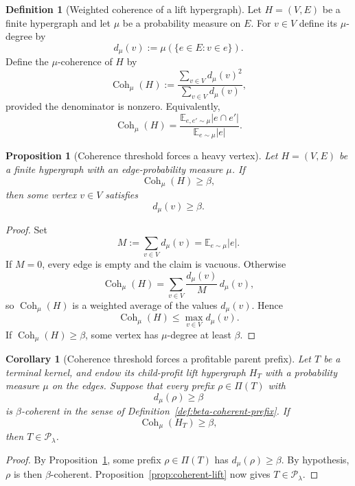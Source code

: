 \documentclass[11pt]{article}
\newtheorem{proposition}[theorem]{Proposition}
\newtheorem{corollary}[theorem]{Corollary}
\theoremstyle{definition}
\newtheorem{definition}[theorem]{Definition}
\newcommand{\1}{\mathbf{1}}
\begin{document}
\begin{definition}[Weighted coherence of a lift hypergraph]\label{def:lift-hypergraph-coherence}
Let $H=(V,E)$ be a finite hypergraph and let $\mu$ be a probability measure on $E$. For $v\in V$ define its $\mu$-degree by
\[
d_\mu(v):=\mu(\{e\in E:v\in e\}).
\]
Define the $\mu$-coherence of $H$ by
\[
\operatorname{Coh}_\mu(H):=
\frac{\sum_{v\in V} d_\mu(v)^2}{\sum_{v\in V} d_\mu(v)},
\]
provided the denominator is nonzero. Equivalently,
\[
\operatorname{Coh}_\mu(H)=
\frac{\mathbb E_{e,e'\sim \mu}|e\cap e'|}{\mathbb E_{e\sim \mu}|e|}.
\]
\end{definition}

\begin{proposition}[Coherence threshold forces a heavy vertex]\label{prop:coherence-heavy-vertex}
Let $H=(V,E)$ be a finite hypergraph with an edge-probability measure $\mu$. If
\[
\operatorname{Coh}_\mu(H)\ge \beta,
\]
then some vertex $v\in V$ satisfies
\[
d_\mu(v)\ge \beta.
\]
\end{proposition}

\begin{proof}
Set
\[
M:=\sum_{v\in V} d_\mu(v)=\mathbb E_{e\sim \mu}|e|.
\]
If $M=0$, every edge is empty and the claim is vacuous. Otherwise
\[
\operatorname{Coh}_\mu(H)
=
\sum_{v\in V}\frac{d_\mu(v)}{M}\,d_\mu(v),
\]
so $\operatorname{Coh}_\mu(H)$ is a weighted average of the values $d_\mu(v)$. Hence
\[
\operatorname{Coh}_\mu(H)\le \max_{v\in V} d_\mu(v).
\]
If $\operatorname{Coh}_\mu(H)\ge \beta$, some vertex has $\mu$-degree at least $\beta$.
\end{proof}

\begin{corollary}[Coherence threshold forces a profitable parent prefix]\label{cor:terminal-coherence-threshold}
Let $T$ be a terminal kernel, and endow its child-profit lift hypergraph $H_T$ with a probability measure $\mu$ on the edges. Suppose that every prefix $\rho\in \Pi(T)$ with
\[
d_\mu(\rho)\ge \beta
\]
is $\beta$-coherent in the sense of Definition~\ref{def:beta-coherent-prefix}. If
\[
\operatorname{Coh}_\mu(H_T)\ge \beta,
\]
then $T\in \mathcal P_\lambda$.
\end{corollary}

\begin{proof}
By Proposition~\ref{prop:coherence-heavy-vertex}, some prefix $\rho\in \Pi(T)$ has $d_\mu(\rho)\ge \beta$. By hypothesis, $\rho$ is then $\beta$-coherent. Proposition~\ref{prop:coherent-lift} now gives $T\in \mathcal P_\lambda$.
\end{proof}
\end{document}
